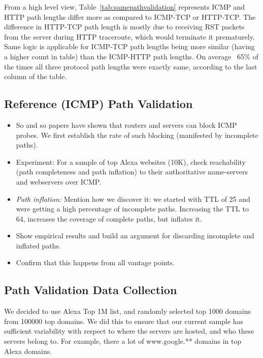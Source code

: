 From a high level view, Table~\ref{tab:samepathvalidation} represents ICMP and HTTP path lengths differ more as compared to ICMP-TCP or HTTP-TCP. The difference in HTTP-TCP path length is mostly due to receiving RST packets from the server during HTTP traceroute, which would terminate it prematurely. Same logic is applicable for ICMP-TCP path lengths being more similar (having a higher count in table) than the ICMP-HTTP path lengths. On average ~65\% of the times all three protocol path lengths were exactly same, according to the last column of the table.

\subsection{Reference (ICMP) Path Validation}
\begin{itemize}
    \item So and so papers have shown that routers and servers can block ICMP
        probes.  We first establish the rate of such blocking (manifested by
        incomplete paths).
     \item Experiment: For a sample of top Alexa websites (10K), check
         reachability (path completeness and path inflation) to their
         authoritative name-servers and webservers over ICMP.  
     \item \textit{Path inflation:} Mention how we discover it: we started with
         TTL of 25 and were getting a high percentage of incomplete paths.
         Increasing the TTL to 64, increases the coverage of complete paths,
         but inflates it.
     \item Show empirical results and build an argument for discarding
         incomplete and inflated paths.
     \item Confirm that this happens from all vantage points.
\end{itemize}

\subsection{Path Validation Data Collection}
We decided to use Alexa Top 1M list, and randomly selected top 1000 domains from 100000 top domains. We did this to ensure that our current sample has sufficient variability with respect to where the servers are hosted, and who these servers belong to. For example, there a lot of www.google.** domains in top Alexa domains.


